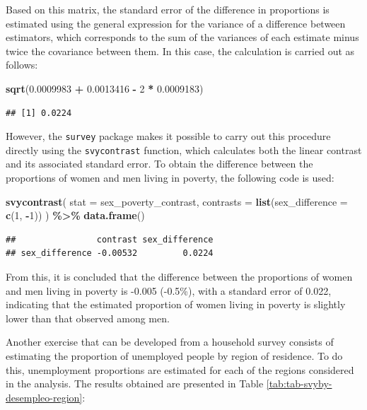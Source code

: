 \documentclass[
  english,
  12pt,
]{book}
\newenvironment{Shaded}{\begin{snugshade}}{\end{snugshade}}
\newcommand{\AttributeTok}[1]{\textcolor[rgb]{0.13,0.29,0.53}{#1}}
\newcommand{\DecValTok}[1]{\textcolor[rgb]{0.00,0.00,0.81}{#1}}
\newcommand{\FloatTok}[1]{\textcolor[rgb]{0.00,0.00,0.81}{#1}}
\newcommand{\FunctionTok}[1]{\textcolor[rgb]{0.13,0.29,0.53}{\textbf{#1}}}
\newcommand{\NormalTok}[1]{#1}
\newcommand{\SpecialCharTok}[1]{\textcolor[rgb]{0.81,0.36,0.00}{\textbf{#1}}}
\begin{document}
Based on this matrix, the standard error of the difference in proportions is estimated using the general expression for the variance of a difference between estimators, which corresponds to the sum of the variances of each estimate minus twice the covariance between them. In this case, the calculation is carried out as follows:

\begin{Shaded}
\begin{Highlighting}[]
\FunctionTok{sqrt}\NormalTok{(}\FloatTok{0.0009983} \SpecialCharTok{+} \FloatTok{0.0013416} \SpecialCharTok{{-}} \DecValTok{2} \SpecialCharTok{*} \FloatTok{0.0009183}\NormalTok{)}
\end{Highlighting}
\end{Shaded}

\begin{verbatim}
## [1] 0.0224
\end{verbatim}

However, the \texttt{survey} package makes it possible to carry out this procedure directly using the \texttt{svycontrast} function, which calculates both the linear contrast and its associated standard error. To obtain the difference between the proportions of women and men living in poverty, the following code is used:

\begin{Shaded}
\begin{Highlighting}[]
\FunctionTok{svycontrast}\NormalTok{(}
  \AttributeTok{stat =}\NormalTok{ sex\_poverty\_contrast,}
  \AttributeTok{contrasts =} \FunctionTok{list}\NormalTok{(}\AttributeTok{sex\_difference =} \FunctionTok{c}\NormalTok{(}\DecValTok{1}\NormalTok{, }\SpecialCharTok{{-}}\DecValTok{1}\NormalTok{))}
\NormalTok{) }\SpecialCharTok{\%\textgreater{}\%}
  \FunctionTok{data.frame}\NormalTok{()}
\end{Highlighting}
\end{Shaded}

\begin{verbatim}
##                contrast sex_difference
## sex_difference -0.00532         0.0224
\end{verbatim}

From this, it is concluded that the difference between the proportions of women and men living in poverty is -0.005 (-0.5\%), with a standard error of 0.022, indicating that the estimated proportion of women living in poverty is slightly lower than that observed among men.

Another exercise that can be developed from a household survey consists of estimating the proportion of unemployed people by region of residence. To do this, unemployment proportions are estimated for each of the regions considered in the analysis. The results obtained are presented in Table \ref{tab:tab-svyby-desempleo-region}:
\end{document}
